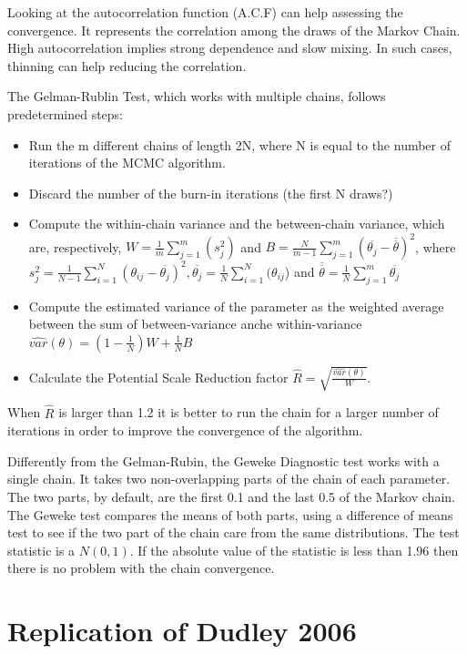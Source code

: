 \documentclass{Class/julia}
\begin{document}
Looking at the autocorrelation function (A.C.F) can help assessing the convergence. It represents the correlation among the draws of the Markov Chain. High autocorrelation implies strong dependence and slow mixing. In such cases, thinning can help reducing the correlation.

The Gelman-Rublin Test, which works with multiple chains, follows predetermined steps:
\begin{itemize}
    \item Run the m different chains of length 2N, where N is equal to the number of iterations of the MCMC algorithm.
    \item Discard the number of the burn-in iterations (the first N draws?) 
    \item Compute the within-chain variance and the between-chain variance, which are, respectively, \(W=\frac{1}{m}\sum^m_{j=1}(s^2_j)\) and \(B=\frac{N}{m-1}\sum^m_{j=1}(\overline{\theta_j}-\overline{\overline{\theta}})^2\), where \(s^2_j=\frac{1}{N-1}\sum^N_{i=1}(\theta_{ij}-\overline{\theta_j})^2, \overline{\theta_j}=\frac{1}{N}\sum^N_{i=1}(\theta_{ij}\)) and \(\overline{\overline{\theta}}=\frac{1}{N}\sum^m_{j=1}\overline{\theta_j}\)
    \item Compute the estimated variance of the parameter as the weighted average between the sum of between-variance anche within-variance \(\hat{var}(\theta)=(1-\frac{1}{N})W+\frac{1}{N}B\)
    \item Calculate the Potential Scale Reduction factor \(\hat{R}=\sqrt{\frac{\hat{var}(\theta)}{W}}\).
\end{itemize}
When \(\hat{R}\) is larger than 1.2 it is better to run the chain for a larger number of iterations in order to improve the convergence of the algorithm. 

Differently from the Gelman-Rubin, the Geweke Diagnostic test works with a single chain. It takes two non-overlapping parts of the chain of each parameter. The two parts, by default, are the first 0.1 and the last 0.5 of the Markov chain. The Geweke test compares the means of both parts, using a difference of means test to see if the two part of the chain care from the same distributions. The test statistic is a \(N(0,1)\). If the absolute value of the statistic is less than 1.96 then there is no problem with the chain convergence.

\section{Replication of Dudley 2006}
\end{document}
